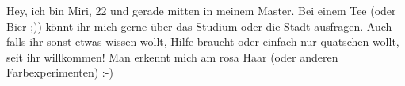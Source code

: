 \begin{multicols*}{2}
{Hey, ich bin Miri, 22 und gerade mitten in meinem Master. Bei einem Tee (oder Bier ;)) könnt ihr mich gerne über das Studium oder die Stadt ausfragen. Auch falls ihr sonst etwas wissen wollt, Hilfe braucht oder einfach nur quatschen wollt, seit ihr willkommen! Man erkennt mich am rosa Haar (oder anderen Farbexperimenten) :-)}







	

	


%
%
%
%

%
\end{multicols*}

